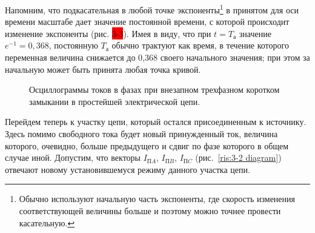 \begin{small}
	Напомним, что подкасательная в любой точке экспоненты\footnote{Обычно используют начальную часть экспоненты, где скорость изменения соответствующей величины больше и поэтому можно точнее провести касательную.} в принятом для оси времени масштабе дает значение постоянной времени, с которой происходит изменение экспоненты (рис. \colorbox{red}{3-3}). Имея в виду, что при $ t = T_{\text{а}} $ значение $ e^{-1} = 0,368 $, постоянную $ T_{\text{а}} $ обычно трактуют как время, в течение которого переменная величина снижается до 0,368 своего начального значения; при этом за начальную может быть принята любая точка кривой.
	
\end{small}

\begin{figure}
	\caption{Осциллограммы токов в фазах при внезапном трехфазном коротком замыкании в простейшей электрической цепи.}
	\label{ris:3-3}
\end{figure}

Перейдем теперь к участку цепи, который остался присоединенным к источнику. Здесь помимо свободного тока будет новый принужденный ток, величина которого, очевидно, больше предыдущего и сдвиг по фазе которого в общем случае иной. Допустим, что векторы $ I_{\text{П}A} $, $ I_{\text{П}B} $, $ I_{\text{П}C} $ (рис.~\ref{ris:3-2 diagram}) отвечают новому установившемуся режиму данного участка цепи.

